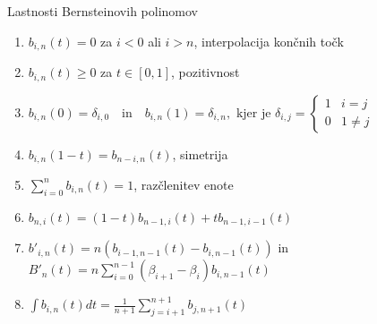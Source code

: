 \documentclass[isrm2, tisk]{fmfdelo}
\newcommand{\lilb}[2]{b_{#1,#2}(t)}
\newcommand{\bigbo}[1]{B'_{#1}(t)}
\newcommand{\bernsteinsumtridva}[2]{\sum_{#1=0}^{#2} \lilb{#1}{#2}}
\begin{document}
    \begin{izrek}{Lastnosti Bernsteinovih polinomov}
        \label{izrek:bernsteinovi_lastnosti}

        \begin{enumerate}
            \item $\lilb{i}{n} = 0$ za $i<0$ ali $i>n$, interpolacija končnih točk \label{izrek:bernsteinovi_lastnosti:interpolacija}
            \item $\lilb{i}{n} \geq 0$ za $t\in[0,1]$, pozitivnost \label{izrek:bernsteinovi_lastnosti:pozitivnost}
            \item $b_{i,n}(0) = \delta_{i,0} \quad \text{in} \quad  b_{i,n}(1) = \delta_{i,n}, \text{ kjer je }  \delta_{i,j} = \begin{cases}
                                                                                                                                    1 & i=j \\
                                                                                                                                    0 & 1\neq j
            \end{cases}$
            \item $b_{i,n}(1-t) = \lilb{n-i}{n}$, simetrija \label{izrek:bernsteinovi_lastnosti:simetrija}
            \item $\bernsteinsumtridva{i}{n} = 1$, razčlenitev enote \label{izrek:bernsteinovi_lastnosti:enota}
            \item $\lilb{n}{i} = (1-t)\lilb{n-1}{i} + t\lilb{n-1}{i-1}$ \label{izrek:bernsteinovi_lastnosti:rekruzija}
            \item $b'_{i,n}(t)=n(\lilb{i-1}{n-1} - \lilb{i}{n-1})$ in  $\bigbo{n}=n\sum^{n-1}_{i=0}(\beta_{i+1}-\beta_{i})b_{i,n-1}(t)$ \label{izrek:bernsteinovi_lastnosti:odvod}
            \item $\int b_{i,n}(t)dt= \frac{1}{n+1}\sum^{n+1}_{j=i+1}b_{j,n+1}(t)$ \label{izrek:bernsteinovi_lastnosti:integral}
        \end{enumerate}
    \end{izrek}
\end{document}
